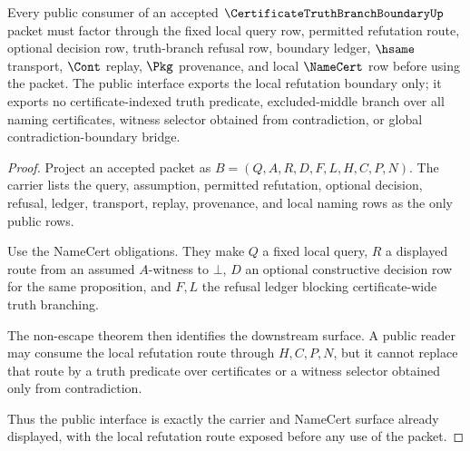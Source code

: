 \begin{theorem}
\label{thm:certificatetruthbranchboundary-public-interface}
Every public consumer of an accepted $\CertificateTruthBranchBoundaryUp$ packet must factor through the fixed local query row, permitted refutation route, optional decision row, truth-branch refusal row, boundary ledger, $\hsame$ transport, $\Cont$ replay, $\Pkg$ provenance, and local $\NameCert$ row before using the packet. The public interface exports the local refutation boundary only; it exports no certificate-indexed truth predicate, excluded-middle branch over all naming certificates, witness selector obtained from contradiction, or global contradiction-boundary bridge.
\end{theorem}
\begin{proof}
Project an accepted packet as $B=(Q,A,R,D,F,L,H,C,P,N)$. The carrier lists the query, assumption, permitted refutation, optional decision, refusal, ledger, transport, replay, provenance, and local naming rows as the only public rows.

Use the NameCert obligations. They make $Q$ a fixed local query, $R$ a displayed route from an assumed $A$-witness to $\bot$, $D$ an optional constructive decision row for the same proposition, and $F,L$ the refusal ledger blocking certificate-wide truth branching.

The non-escape theorem then identifies the downstream surface. A public reader may consume the local refutation route through $H,C,P,N$, but it cannot replace that route by a truth predicate over certificates or a witness selector obtained only from contradiction.

Thus the public interface is exactly the carrier and NameCert surface already displayed, with the local refutation route exposed before any use of the packet.
\end{proof}

